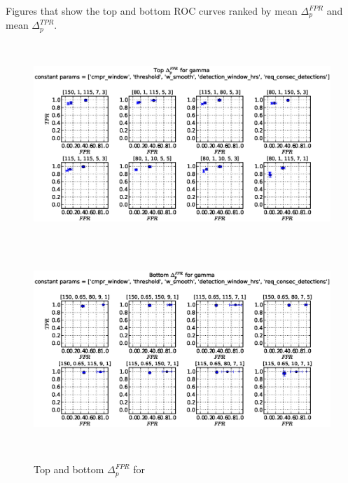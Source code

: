 Figures that show the top and bottom ROC curves ranked by mean $\Delta_p^{FPR}$ and mean $\Delta_p^{TPR}$.

\begin{figure}[!h]
\begin{center}
\includegraphics[height=3in]{../fig/final/top_fpr/gamma}
\includegraphics[height=3in]{../fig/final/bottom_fpr/gamma}
\end{center}
\caption{\label{fig:delta_top_bottom1f} Top and bottom $\Delta_p^{FPR}$ for }
\end{figure}


